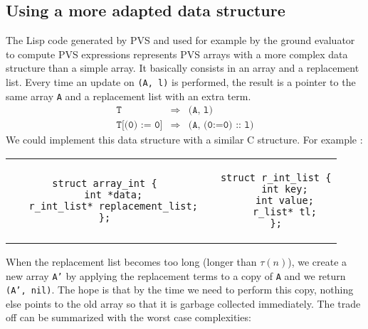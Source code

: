 \documentclass[12pt,a4paper]{article}
\newcommand{\cl}[1]{\texttt{#1}}
\begin{document}
\subsection{Using a more adapted data structure}

The Lisp code generated by PVS and used for example by the ground evaluator to compute PVS expressions represents PVS arrays with a more complex data structure than a simple array. It basically consists in an array and a replacement list. Every time an update on \cl{(A, l)} is performed, the result is a pointer to the same array \cl{A} and a replacement list with an extra term.
\begin{eqnarray*}
\cl{T} &\Longrightarrow& \cl{(A, l)} \\
\cl{T[(0) := 0]}&\Longrightarrow& \cl{(A, (0:=0) :: l)}
\end{eqnarray*}
We could implement this data structure with a similar C structure. For example :
\begin{center}
\begin{tabular}{ccc}
\begin{lstlisting}
struct array_int {
   int *data;
   r_int_list* replacement_list;
};
\end{lstlisting}
&  \hspace{2cm} &
\begin{lstlisting}
struct r_int_list {
   int key;
   int value;
   r_list* tl;
};
\end{lstlisting}
\end{tabular}
\end{center}
When the replacement list becomes too long (longer than $\tau(n)$), we create a new array \cl{A'} by applying the replacement terms to a copy of \cl{A} and we return \cl{(A', nil)}. The hope is that by the time we need to perform this copy, nothing else points to the old array so that it is garbage collected immediately. The trade off can be summarized with the worst case complexities:
\end{document}
